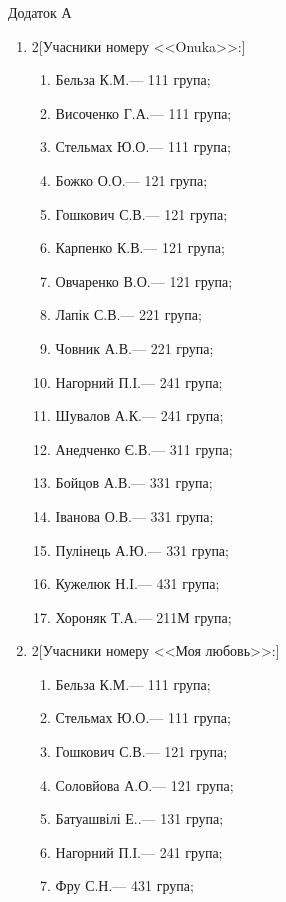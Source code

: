 \documentclass[
	a4paper,
	12pt,
	oneside,
	draft
]{extreport}
\newcommand{\writerTel}[2]{
	\vfill\scriptsize\parindent=-0.5mm
	\par\noindent #1
	\par\noindent #2}
\begin{document}
\newpage
\hfill {Додаток А}

\begin{enumerate}[topsep=0pt,itemsep=-1ex,partopsep=1ex,parsep=1ex]

\item 
\begin{multicols}{2}[Учасники номеру <<Onuka>>:] 
\begin{enumerate}[topsep=0pt,itemsep=-1ex,partopsep=1ex,parsep=1ex,label=\arabic*.]
\item Бельза К.М.\hfill --- 111 група;
\item Височенко Г.А.\hfill --- 111 група;
\item Стельмах Ю.О.\hfill --- 111 група;
\item Божко О.О.\hfill --- 121 група;
\item Гошкович С.В.\hfill --- 121 група;
\item Карпенко К.В.\hfill --- 121 група;
\item Овчаренко В.О.\hfill --- 121 група;
\item Лапік С.В.\hfill --- 221 група;
\item Човник А.В.\hfill --- 221 група;
\item Нагорний П.І.\hfill --- 241 група;
\item Шувалов А.К.\hfill --- 241 група;
\item Анедченко Є.В.\hfill --- 311 група;
\item Бойцов А.В.\hfill --- 331 група;
\item Іванова О.В.\hfill --- 331 група;
\item Пулінець А.Ю.\hfill --- 331 група;
\item Кужелюк Н.І.\hfill --- 431 група;
\item Хороняк Т.А.\hfill --- 211М група;
\end{enumerate}
\end{multicols}

\item 
\begin{multicols}{2}[Учасники номеру <<Моя любовь>>:] 
\begin{enumerate}[topsep=0pt,itemsep=-1ex,partopsep=1ex,parsep=1ex,label=\arabic*.]
\item Бельза К.М.\hfill --- 111 група;
\item Стельмах Ю.О.\hfill --- 111 група;
\item Гошкович С.В.\hfill --- 121 група;
\item Соловйова А.О.\hfill --- 121 група;
\item Батуашвілі Е..\hfill --- 131 група;
\item Нагорний П.І.\hfill --- 241 група;
\item Фру С.Н.\hfill --- 431 група;
\end{enumerate}
\end{multicols}


\end{enumerate}
\end{document}
